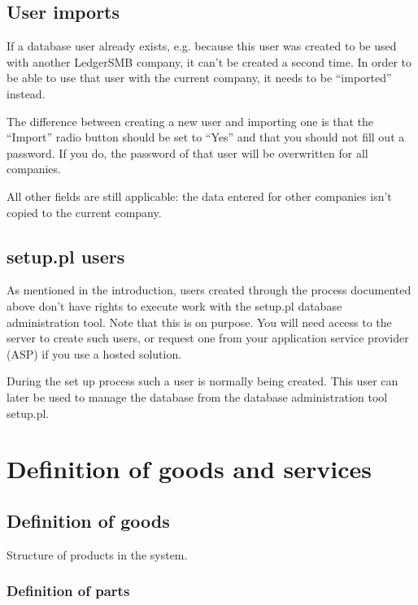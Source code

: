 \section{User imports}
\label{sec-user-imports}

If a database user already exists, e.g. because this user was created to be used
with another LedgerSMB company, it can't be created a second time. In order to be
able to use that user with the current company, it needs to be ``imported'' instead.

The difference between creating a new user and importing one is that the ``Import''
radio button should be set to ``Yes'' and that you should not fill out a password.
If you do, the password of that user will be overwritten for all companies.

All other fields are still applicable: the data entered for other companies isn't
copied to the current company.


\section{setup.pl users}

As mentioned in the introduction, users created through the process documented above
don't have rights to execute work with the setup.pl database administration tool.
Note that this
is on purpose. You will need access to the server to create such users, or request
one from your application service provider (ASP) if you use a hosted solution.

During the set up process such a user is normally being created. This user can later
be used to manage the database from the database administration tool setup.pl.


\chapter{Definition of goods and services}
\label{cha-products-definition}


\section{Definition of goods}
Structure of products in the system.

\subsection{Definition of parts}
\label{sec-definition-parts}

